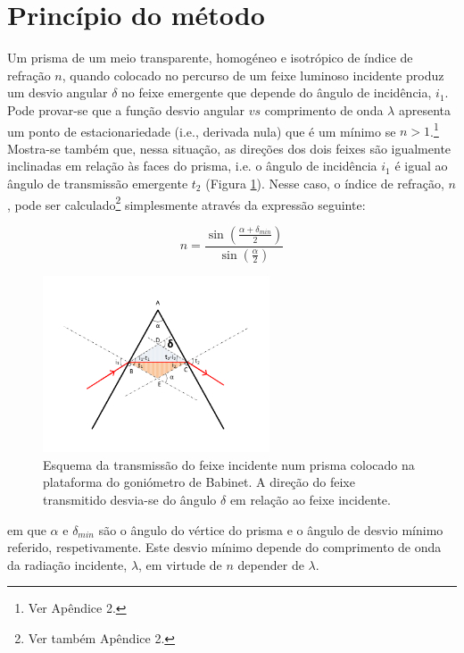 \documentclass[a4paper,12pt]{article}  %
\begin{document}
\section{\sf Princípio do método}
Um prisma de um meio transparente, homogéneo e isotrópico de índice de refração $n$, quando colocado no percurso de um feixe luminoso incidente produz um desvio angular $\delta$ no feixe emergente que depende do ângulo de incidência, $i_1$. Pode provar-se que a função desvio angular $vs$ comprimento de onda $\lambda$ apresenta um ponto de estacionariedade (i.e., derivada nula) que é um mínimo se $n > 1$.\footnote{Ver Apêndice 2.}
Mostra-se também que, nessa situação, as direções dos dois feixes são igualmente inclinadas em relação às faces do prisma, i.e.  o ângulo de incidência $i_1$ é igual ao ângulo de transmissão emergente $t_2$ (Figura \ref{fig:desvio}). 
Nesse caso, o índice de refração, $n$, pode ser calculado\footnote{Ver também Apêndice 2.} simplesmente através da expressão seguinte: 

\begin{equation}
	\label{eq:desviomim}
	n= \frac{\sin \left( \frac{\alpha+ \delta_{min}}{2} \right) } {\sin \left(  \frac{\alpha}{2} \right)}  
\end{equation}




\begin{figure}[htb]  \centering 
	\includegraphics[width=0.6\textwidth]{desvio}
	\caption{Esquema da transmissão do feixe incidente num prisma colocado na plataforma do goniómetro de Babinet. A direção do feixe transmitido desvia-se do ângulo $\delta$ em relação ao feixe incidente. \label{fig:desvio}} 
\end{figure}


em que $\alpha$ e  $\delta_{min}$ são o ângulo do vértice do prisma e o ângulo de desvio mínimo referido, respetivamente. Este desvio mínimo depende do comprimento de onda da radiação incidente, $\lambda$, em virtude de  $n$ depender de $\lambda$. 
\end{document}
